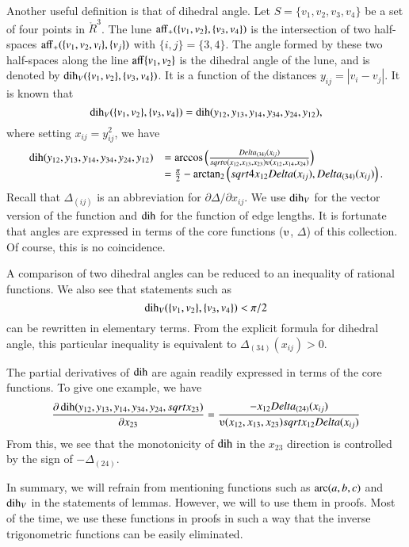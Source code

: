 \begin{tarskidata}
Another useful definition is that of dihedral angle.  Let 
$S=\{v_1,v_2,v_3,v_4\}$ be a set of four points in $\ring{R}^3$.
The lune ${\operatorname{aff}}_+(\{v_1,v_2\},\{v_3,v_4\})$ is the intersection
of two half-spaces ${\operatorname{aff}}_+(\{v_1,v_2,v_i\},\{v_j\})$ with
$\{i,j\}=\{3,4\}$.  The angle formed by these two half-spaces along
the line ${\operatorname{aff}}\{v_1,v_2\}$ is the dihedral angle of the lune,
and is denoted by $\operatorname{dih}_V(\{v_1,v_2\},\{v_3,v_4\})$.  It is a function
of the distances $y_{ij} = |v_i-v_j|$.  It is known that
 $$
 \operatorname{dih}_V(\{v_1,v_2\},\{v_3,v_4\}) = 
  \operatorname{dih}(y_{12},y_{13},y_{14},y_{34},y_{24},y_{12}),
 $$
where setting $x_{ij}=y_{ij}^2$, we have
 $$\begin{array}{lll}
  \dih(y_{12},y_{13},y_{14},y_{34},y_{24},y_{12}) &=
  \arccos\left(\frac{\Delta_{(34)}(x_{ij})}{\sqrt{
    \ups(x_{12},x_{13},x_{23})\ups(x_{12},x_{14},x_{24})}}\right)\\
    &=\frac{\pi}{2} - \atn
     \left({\sqrt{4 x_{12} \Delta(x_{ij})}},{\Delta_{(34)}(x_{ij})}\right).
  \end{array} 
 $$
Recall that $\Delta_{(ij)}$ is an abbreviation for 
$\partial\Delta/\partial x_{ij}$.  We use $\operatorname{dih}_V$ for the
vector version of the function and $\operatorname{dih}$ for the function of
edge lengths.
It is fortunate that angles are expressed in terms of the 
core functions ($\ups$, $\Delta$) of this collection.  Of course,
this is no coincidence.


A comparison of two dihedral angles can be reduced to an inequality
of rational functions. We also see that statements such as
  $$
  \operatorname{dih}_V(\{v_1,v_2\},\{v_3,v_4\}) < \pi/2
  $$
can be rewritten in elementary terms.  From the explicit formula
for dihedral angle, this particular inequality
is equivalent to $\Delta_{(34)}(x_{ij}) > 0$.

The partial derivatives of $\operatorname{dih}$ are again readily expressed in
terms of the core functions.
To give one example, we have
  $$
  \frac{\partial\dih(y_{12},y_{13},y_{14},y_{34},y_{24},\sqrt{x_{23}})}
  {\partial x_{23}} = 
  \frac{ -x_{12} \Delta_{(24)}(x_{ij})} {\ups(x_{12},x_{13},x_{23})
   \sqrt{x_{12}\Delta(x_{ij})}}
  $$
From this, we see that the monotonicity of $\operatorname{dih}$
in the $x_{23}$ direction is controlled by the sign of
$-\Delta_{(24)}$.




In summary, we will refrain from mentioning functions such as
$\operatorname{arc}(a,b,c)$ and $\operatorname{dih}_V$ in the statements of lemmas.  However,
we will to use them in proofs.  Most of the time, we use
these functions in proofs in such a way that the inverse
trigonometric functions
can be easily eliminated.




\end{tarskidata}
